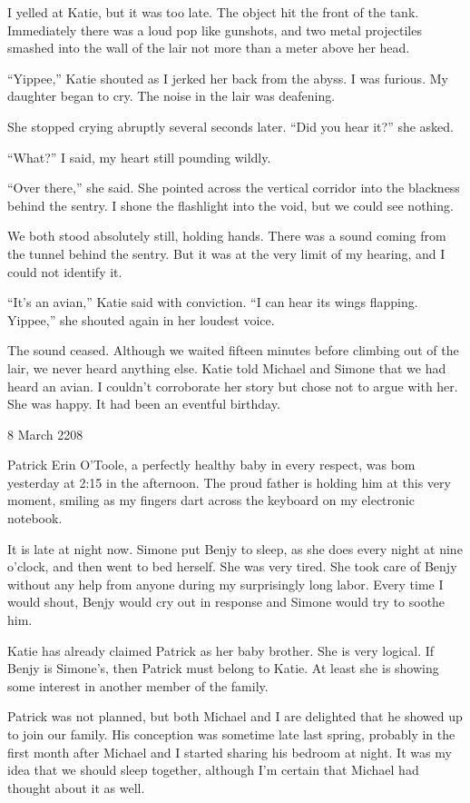 \documentclass[]{article}
\begin{document}
I yelled at Katie, but it was too late. The object hit the front of the tank. Immediately there was a loud pop like gunshots, and two metal projectiles smashed into the wall of the lair not more than a meter above her head.

“Yippee,” Katie shouted as I jerked her back from the abyss. I was furious. My daughter began to cry. The noise in the lair was deafening.

She stopped crying abruptly several seconds later. “Did you hear it?” she asked.

“What?” I said, my heart still pounding wildly.

“Over there,” she said. She pointed across the vertical corridor into the blackness behind the sentry. I shone the flashlight into the void, but we could see nothing.

We both stood absolutely still, holding hands. There was a sound coming from the tunnel behind the sentry. But it was at the very limit of my hearing, and I could not identify it.

“It’s an avian,” Katie said with conviction. “I can hear its wings flapping. Yippee,” she shouted again in her loudest voice.

The sound ceased. Although we waited fifteen minutes before climbing out of the lair, we never heard anything else. Katie told Michael and Simone that we had heard an avian. I couldn’t corroborate her story but chose not to argue with her. She was happy. It had been an eventful birthday.

8 March 2208

Patrick Erin O’Toole, a perfectly healthy baby in every respect, was bom yesterday at 2:15 in the afternoon. The proud father is holding him at this very moment, smiling as my fingers dart across the keyboard on my electronic notebook.

It is late at night now. Simone put Benjy to sleep, as she does every night at nine o’clock, and then went to bed herself. She was very tired. She took care of Benjy without any help from anyone during my surprisingly long labor. Every time I would shout, Benjy would cry out in response and Simone would try to soothe him.

Katie has already claimed Patrick as her baby brother. She is very logical. If Benjy is Simone’s, then Patrick must belong to Katie. At least she is showing some interest in another member of the family.

Patrick was not planned, but both Michael and I are delighted that he showed up to join our family. His conception was sometime late last spring, probably in the first month after Michael and I started sharing his bedroom at night. It was my idea that we should sleep together, although I’m certain that Michael had thought about it as well.
\end{document}
